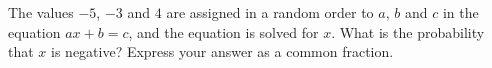 The values $-5$, $-3$ and $4$ are assigned in a random order to $a$, $b$ and $c$ in the equation $ax+b=c$, and the equation is solved for $x$. What is the probability that $x$ is negative? Express your answer as a common fraction.
